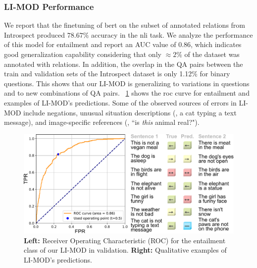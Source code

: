 

\subsubsection{LI-MOD Performance} We report that the finetuning of \gls{bert} on the subset of annotated relations from Introspect produced $78.67\%$ accuracy in the \gls{nli} task. We analyze the performance of this model for entailment and report an AUC value of 0.86, which indicates good generalization capability considering that only $\approx 2 \%$ of the dataset was annotated with relations. In addition, the overlap in the QA pairs between the train and validation sets of the Introspect dataset is only 1.12\% for binary questions. This shows that our LI-MOD is generalizing to variations in questions and to new combinations of QA pairs. \fig~\ref{fig:roc_dot} shows the \gls{roc} curve for entailment and examples of LI-MOD's predictions. Some of the observed sources of errors in LI-MOD include negations, unusual situation descriptions (\eg, a cat typing a text message), and image-specific references (\eg, ``is \textit{this} animal real?"). 
\begin{figure}
    \centering
    \includegraphics[width=0.8\linewidth]{Figures/Part2_Consist/02_logic/roc_examples_s.pdf}
    \caption{\textbf{Left:} Receiver Operating Characteristic (ROC) for the entailment class of our LI-MOD in validation. \textbf{Right:} Qualitative examples of LI-MOD's predictions.}
    \label{fig:roc_dot}
\end{figure}


